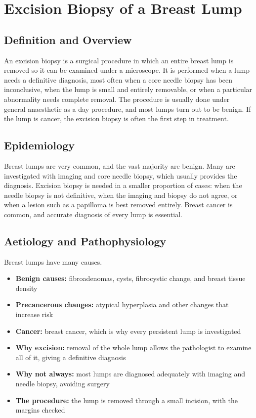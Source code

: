 \chapter{Excision Biopsy of a Breast Lump}

\section*{Definition and Overview}
An excision biopsy is a surgical procedure in which an entire breast lump is removed so it can be examined under a microscope. It is performed when a lump needs a definitive diagnosis, most often when a core needle biopsy has been inconclusive, when the lump is small and entirely removable, or when a particular abnormality needs complete removal. The procedure is usually done under general anaesthetic as a day procedure, and most lumps turn out to be benign. If the lump is cancer, the excision biopsy is often the first step in treatment.

\section*{Epidemiology}
Breast lumps are very common, and the vast majority are benign. Many are investigated with imaging and core needle biopsy, which usually provides the diagnosis. Excision biopsy is needed in a smaller proportion of cases: when the needle biopsy is not definitive, when the imaging and biopsy do not agree, or when a lesion such as a papilloma is best removed entirely. Breast cancer is common, and accurate diagnosis of every lump is essential.

\section*{Aetiology and Pathophysiology}
Breast lumps have many causes.
\begin{itemize}
    \item \textbf{Benign causes:} fibroadenomas, cysts, fibrocystic change, and breast tissue density
    \item \textbf{Precancerous changes:} atypical hyperplasia and other changes that increase risk
    \item \textbf{Cancer:} breast cancer, which is why every persistent lump is investigated
    \item \textbf{Why excision:} removal of the whole lump allows the pathologist to examine all of it, giving a definitive diagnosis
    \item \textbf{Why not always:} most lumps are diagnosed adequately with imaging and needle biopsy, avoiding surgery
    \item \textbf{The procedure:} the lump is removed through a small incision, with the margins checked
\end{itemize}

